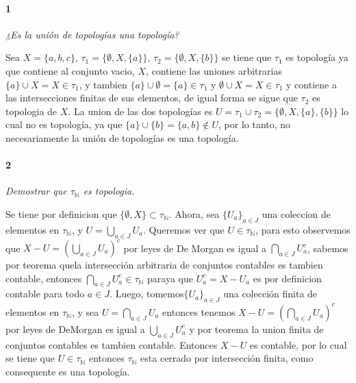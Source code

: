 \documentclass[12pt]{article}
\author{Alumnos: \\Arturo Rodriguez Contreras - 2132880 \\
Jonathan Raymundo Torres Cardenas - 1949731\\
Praxedis Jimenes Ruvalcaba \\
Erick Román Montemayor Treviño - 1957959 \\
Alexis Noe Mora Leyva \\}
\begin{document}
\maketitle
\paragraph{1}
\textit{¿Es la unión de topologías una topología?}

Sea $X = \{ a, b, c \}$, $\tau_{1} = \{\emptyset, X, \{a\} \}$, $ \tau_{2} = \{\emptyset, X, \{b\} \}$
se tiene que $\tau_{1}$ es topología ya que contiene al conjunto vacio, $X$, contiene las uniones arbitrarias
$\{a\} \cup X = X \in \tau_{1}$, y tambien
$\{a\} \cup \emptyset = \{a\} \in \tau_{1}$
y $\emptyset \cup X = X \in \tau_{1}$
y contiene a las intersecciones finitas de sus elementos, 
de igual forma se sigue que $\tau_{2}$ es topologia de $X$. La union de las dos topologías es
$U = \tau_{1} \cup \tau_{2} = \{ \emptyset, X, \{a\}, \{b\} \}$
lo cual no es topolog\'ia, ya que $\{a\} \cup \{b\} = \{a, b\} \notin U$, por lo tanto, no
necesariamente la unión de topologías es una topología.\\

\paragraph{2}
\textit{Demostrar que $\tau_{\mathbb{N}}$ es topologia.}

Se tiene por definicion que $\{\emptyset, X\} \subset \tau_{\mathbb{N}}$. Ahora, sea $\{U_{a}\}_{a \in J}$ una coleccion de elementos en $\tau_{\mathbb{N}}$,
y $U = \bigcup_{a \in J} U_{a}$. Queremos ver que $U \in \tau_{\mathbb{N}}$, para
esto observemos que $X - U = (\bigcup_{a \in J} U_{a})^{c} $ por leyes de De Morgan es igual a
$\bigcap_{a \in J} U_{a}^{c}$, sabemos por teorema quela intersecci\'on arbitraria de conjuntos contables es tambien
contable, entonces $\bigcap_{a \in J} U_{a}^{c} \in \tau_{\mathbb{N}}$ paraya que $U_{a}^{c} = X - U_{a}$ es por definicion contable
para todo $a \in J$. Luego, tomemos$\{U_{a}\}_{a \in J}$ una colecci\'on finita de elementos en
$\tau_{\mathbb{N}}$, y sea $U = \bigcap_{a \in J}U_{a}$ entonces tenemos $X - U = (\bigcap_{a \in J}U_{a})^{c}$ por leyes de DeMorgan es igual a $\bigcup_{a \in J}U_{a}^{c}$ y por teorema
la union finita de conjuntos contables es tambien
contable. Entonces $X - U$ es contable, por lo cual se tiene que $U \in \tau_{\mathbb{N}}$ entonces $\tau_{\mathbb{N}}$ esta
cerrado por intersecci\'on finita, como consequente es una topolog\'ia.\\
\end{document}
